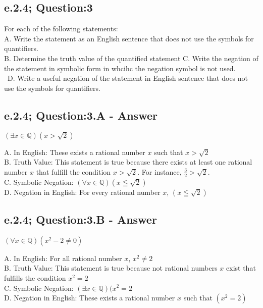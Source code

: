 \subsection{e.2.4; Question:3}
For each of the following statements: \\
A. Write the statement as an English sentence that does not use the symbols for quantifiers. \\
B. Determine the truth value of the quantified statement
C. Write the negation of the statement in symbolic form in whcihc the negation symbol is not used. \\\
D. Write a useful negation of the statement in English sentence that does not use the symbols for quantifiers. 

\subsection{e.2.4; Question:3.A - Answer}
	\begin{center}
		$(\exists x \in \mathbb{Q})(x > \sqrt{2})$
	\end{center}
A. In English: These exists a rational number $x$ such that $x > \sqrt{2}$ \\
B. Truth Value: This statement is true because there exists at least one rational number $x$ that fulfill the condition $x > \sqrt{2}$. For instance, $\frac{3}{2} > \sqrt{2}$. \\ 
C. Symbolic Negation: $(\forall x \in \mathbb{Q})(x \leqq \sqrt{2})$ \\
D. Negation in English: For every rational number $x$, $(x \leqq \sqrt{2})$ \\


\subsection{e.2.4; Question:3.B - Answer}
	\begin{center}
		$(\forall x \in \mathbb{Q})(x^2 -2 \neq 0)$
	\end{center}
A. In English: For all rational number $x$, $x^2 \neq 2$ \\
B. Truth Value: This statement is true because not rational numbers $x$ exist that  fulfills the condition $x^2 = 2$ \\
C. Symbolic Negation: $(\exists x \in \mathbb{Q})(x^2 = 2$ \\
D. Negation in English: These exists a rational number $x$ such that  $(x^2 = 2)$ \\


